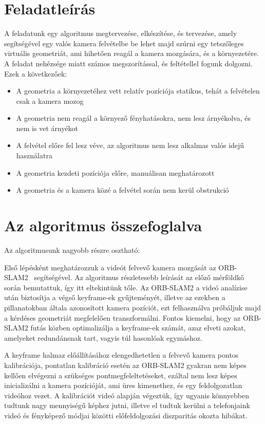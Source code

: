 \section{Feladatleírás}

A feladatunk egy algoritmus megtervezése, elkészítése, és tervezése, amely segítségével egy valós kamera felvételbe be lehet majd szúrni egy tetszőleges virtuális geometriát, ami hihetően reagál a kamera mozgására, és a környezetére.
A feladat nehézsége miatt számos megszorítással, és feltétellel fogunk dolgozni.
Ezek a következőek:

\begin{itemize}
	\item A geometria a környezetéhez vett relatív pozíciója statikus, tehát a felvételen csak a kamera mozog
	\item A geometria nem reagál a környező fényhatásokra, nem lesz árnyékolva, és nem is vet árnyékot
	\item A felvétel előre fel lesz véve, az algoritmus nem lesz alkalmas valós idejű használatra
	\item A geometria kezdeti pozíciója előre, manuálisan meghatározott
	\item A geometria és a kamera közé a felvétel során nem kerül obstrukció
\end{itemize}

\section{Az algoritmus összefoglalva}

Az algoritmusunk nagyobb részre osztható:

Első lépésként meghatározzuk a videót felvevő kamera mozgását az ORB-SLAM2~\cite{mur2015orb} segítségével.
Az algoritmus részletesebb leírását az előző mérföldkő során bemutattuk, így itt eltekintünk tőle.
Az ORB-SLAM2 a videó analízise után biztosítja a végső keyframe-ek gyűjteményét, illetve az ezekben a pillanatokban általa azonosított kamera pozíciót, ezt felhasználva próbáljuk majd a kérdéses geometriát megfelelően transzformálni.
Fontos kiemelni, hogy az ORB-SLAM2 futás közben optimalizálja a keyframe-ek számát, azaz elveti azokat, amelyeket redundánsnak tart, vagyis túl hasonlóak egymáshoz.

A keyframe halmaz előállításához elengedhetetlen a felvevő kamera pontos kalibrációja, pontatlan kalibráció esetén az ORB-SLAM2 gyakran nem képes kellően elvégezni a szükséges pontmegfeleltetéseket, ezáltal nem lesz képes inicializálni a kamera pozícióját, ami üres kimenethez, és egy feldolgozatlan videóhoz vezet.
A kalibrációt videó alapján végeztük, így ugyanis könnyebben tudtunk nagy mennyiségű képhez jutni, illetve el tudtuk kerülni a telefonjaink videó és fényképező módjai közötti előfeldolgozási diszparitás okozta hibákat.

